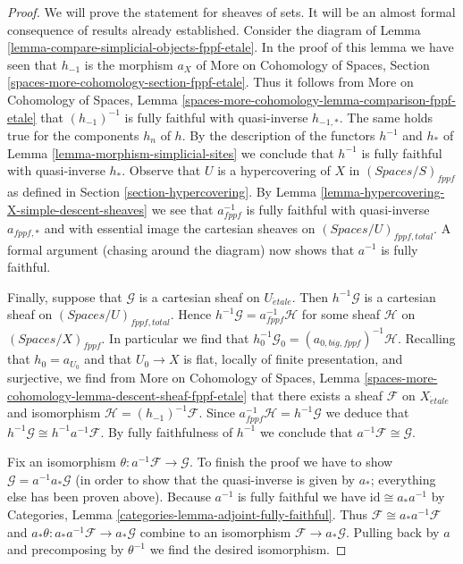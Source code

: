 \documentclass{stacks-project}
\theoremstyle{plain}
\theoremstyle{definition}
\theoremstyle{remark}
\numberwithin{equation}{subsection}
\def\etale{{\acute{e}tale}}
\begin{document}
\begin{proof}
We will prove the statement for sheaves of sets. It will be an
almost formal consequence of results already established.
Consider the diagram of
Lemma \ref{lemma-compare-simplicial-objects-fppf-etale}.
In the proof of this lemma we have seen that
$h_{-1}$ is the morphism $a_X$ of
More on Cohomology of Spaces, Section
\ref{spaces-more-cohomology-section-fppf-etale}.
Thus it follows from
More on Cohomology of Spaces, Lemma
\ref{spaces-more-cohomology-lemma-comparison-fppf-etale}
that $(h_{-1})^{-1}$ is fully faithful with quasi-inverse $h_{-1, *}$.
The same holds true for the components $h_n$ of $h$.
By the description of the functors $h^{-1}$ and $h_*$ of
Lemma \ref{lemma-morphism-simplicial-sites}
we conclude that $h^{-1}$ is fully faithful with quasi-inverse $h_*$.
Observe that $U$ is a hypercovering of $X$ in $(\textit{Spaces}/S)_{fppf}$
as defined in Section \ref{section-hypercovering}.
By Lemma \ref{lemma-hypercovering-X-simple-descent-sheaves}
we see that $a_{fppf}^{-1}$ is fully faithful with quasi-inverse
$a_{fppf, *}$ and with essential image the cartesian sheaves
on $(\textit{Spaces}/U)_{fppf, total}$.
A formal argument (chasing around the diagram) now shows that
$a^{-1}$ is fully faithful.

\medskip\noindent
Finally, suppose that $\mathcal{G}$ is a cartesian sheaf on $U_\etale$.
Then $h^{-1}\mathcal{G}$ is a cartesian sheaf on
$(\textit{Spaces}/U)_{fppf, total}$. Hence
$h^{-1}\mathcal{G} = a_{fppf}^{-1}\mathcal{H}$ for some sheaf
$\mathcal{H}$ on $(\textit{Spaces}/X)_{fppf}$.
In particular we find that
$h_0^{-1}\mathcal{G}_0 = (a_{0, big, fppf})^{-1}\mathcal{H}$.
Recalling that $h_0 = a_{U_0}$ and that $U_0 \to X$ is
flat, locally of finite presentation, and surjective, we
find from More on Cohomology of Spaces,
Lemma \ref{spaces-more-cohomology-lemma-descent-sheaf-fppf-etale}
that there exists a sheaf $\mathcal{F}$ on $X_\etale$ and isomorphism
$\mathcal{H} = (h_{-1})^{-1}\mathcal{F}$.
Since $a_{fppf}^{-1}\mathcal{H} = h^{-1}\mathcal{G}$
we deduce that $h^{-1}\mathcal{G} \cong h^{-1}a^{-1}\mathcal{F}$.
By fully faithfulness of $h^{-1}$ we conclude that
$a^{-1}\mathcal{F} \cong \mathcal{G}$.

\medskip\noindent
Fix an isomorphism $\theta : a^{-1}\mathcal{F} \to \mathcal{G}$.
To finish the proof we have to show $\mathcal{G} = a^{-1}a_*\mathcal{G}$
(in order to show that the quasi-inverse is given by $a_*$; everything
else has been proven above).
Because $a^{-1}$ is fully faithful we have $\text{id} \cong a_*a^{-1}$ by
Categories, Lemma \ref{categories-lemma-adjoint-fully-faithful}.
Thus $\mathcal{F} \cong a_*a^{-1}\mathcal{F}$ and
$a_*\theta : a_*a^{-1}\mathcal{F} \to a_*\mathcal{G}$
combine to an isomorphism $\mathcal{F} \to a_*\mathcal{G}$.
Pulling back by $a$ and precomposing by $\theta^{-1}$
we find the desired isomorphism.
\end{proof}
\end{document}
